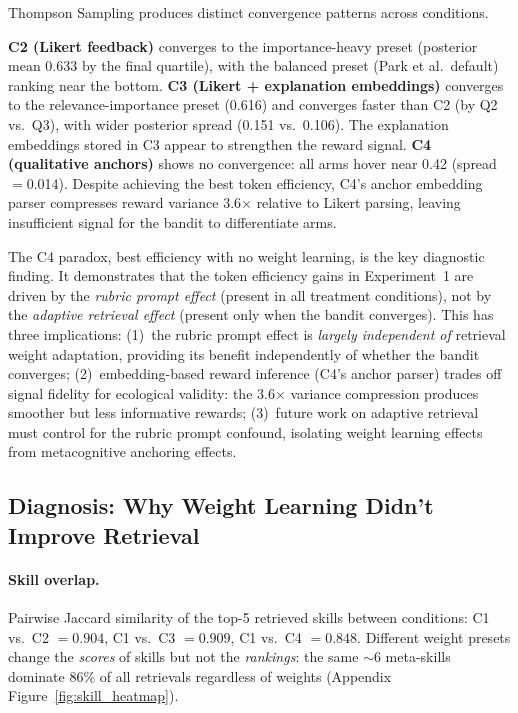 Thompson Sampling produces distinct convergence patterns across conditions.

\textbf{C2 (Likert feedback)} converges to the importance-heavy preset (posterior mean 0.633 by the final quartile), with the balanced preset (Park et al.\ default) ranking near the bottom.
\textbf{C3 (Likert + explanation embeddings)} converges to the relevance-importance preset (0.616) and converges faster than C2 (by Q2 vs.\ Q3), with wider posterior spread (0.151 vs.\ 0.106).
The explanation embeddings stored in C3 appear to strengthen the reward signal.
\textbf{C4 (qualitative anchors)} shows no convergence: all arms hover near 0.42 (spread $=$0.014).
Despite achieving the best token efficiency, C4's anchor embedding parser compresses reward variance 3.6$\times$ relative to Likert parsing, leaving insufficient signal for the bandit to differentiate arms.

The C4 paradox, best efficiency with no weight learning, is the key diagnostic finding.
It demonstrates that the token efficiency gains in Experiment~1 are driven by the \emph{rubric prompt effect} (present in all treatment conditions), not by the \emph{adaptive retrieval effect} (present only when the bandit converges).
This has three implications: (1)~the rubric prompt effect is \emph{largely independent of} retrieval weight adaptation, providing its benefit independently of whether the bandit converges; (2)~embedding-based reward inference (C4's anchor parser) trades off signal fidelity for ecological validity: the 3.6$\times$ variance compression produces smoother but less informative rewards; (3)~future work on adaptive retrieval must control for the rubric prompt confound, isolating weight learning effects from metacognitive anchoring effects.

\subsection{Diagnosis: Why Weight Learning Didn't Improve Retrieval}

\paragraph{Skill overlap.}
Pairwise Jaccard similarity of the top-5 retrieved skills between conditions: C1 vs.\ C2 $= 0.904$, C1 vs.\ C3 $= 0.909$, C1 vs.\ C4 $= 0.848$.
Different weight presets change the \emph{scores} of skills but not the \emph{rankings}: the same ${\sim}$6 meta-skills dominate 86\% of all retrievals regardless of weights (Appendix Figure~\ref{fig:skill_heatmap}).

